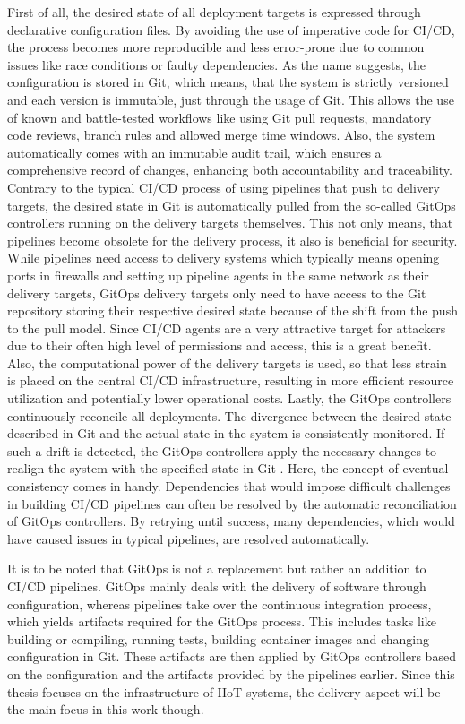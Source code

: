     First of all, the desired state of all deployment targets is expressed through declarative configuration files. By avoiding the use of imperative code for CI/CD, the process becomes more reproducible and less error-prone due to common issues like race conditions or faulty dependencies. As the name suggests, the configuration is stored in Git, which means, that the system is strictly versioned and each version is immutable, just through the usage of Git. This allows the use of known and battle-tested workflows like using Git pull requests, mandatory code reviews, branch rules and allowed merge time windows. Also, the system automatically comes with an immutable audit trail, which ensures a comprehensive record of changes, enhancing both accountability and traceability. Contrary to the typical CI/CD process of using pipelines that push to delivery targets, the desired state in Git is automatically pulled from the so-called GitOps controllers running on the delivery targets themselves. This not only means, that pipelines become obsolete for the delivery process, it also is beneficial for security. While pipelines need access to delivery systems which typically means opening ports in firewalls and setting up pipeline agents in the same network as their delivery targets, GitOps delivery targets only need to have access to the Git repository storing their respective desired state because of the shift from the push to the pull model. Since CI/CD agents are a very attractive target for attackers due to their often high level of permissions and access, this is a great benefit. Also, the computational power of the delivery targets is used, so that less strain is placed on the central CI/CD infrastructure, resulting in more efficient resource utilization and potentially lower operational costs. Lastly, the GitOps controllers continuously reconcile all deployments. The divergence between the desired state described in Git and the actual state in the system is consistently monitored. If such a drift is detected, the GitOps controllers apply the necessary changes to realign the system with the specified state in Git \cite{lopez-viana_continuous_2022}. Here, the concept of eventual consistency comes in handy. Dependencies that would impose difficult challenges in building CI/CD pipelines can often be resolved by the automatic reconciliation of GitOps controllers. By retrying until success, many dependencies, which would have caused issues in typical pipelines, are resolved automatically.
    
    It is to be noted that GitOps is not a replacement but rather an addition to CI/CD pipelines. GitOps mainly deals with the delivery of software through configuration, whereas pipelines take over the continuous integration process, which yields artifacts required for the GitOps process. This includes tasks like building or compiling, running tests, building container images and changing configuration in Git. These artifacts are then applied by GitOps controllers based on the configuration and the artifacts provided by the pipelines earlier. Since this thesis focuses on the infrastructure of IIoT systems, the delivery aspect will be the main focus in this work though. \newline 

